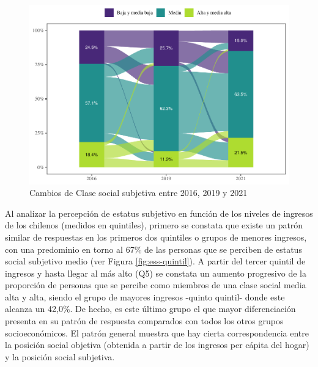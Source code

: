 \documentclass[
  12pt,
]{book}
\begin{document}
\begin{figure}

{\centering \includegraphics{reporte-elsoc_files/figure-latex/ess-cambio-1} 

}

\caption{Cambios de Clase social subjetiva entre 2016, 2019 y 2021}\label{fig:ess-cambio}
\end{figure}

Al analizar la percepción de estatus subjetivo en función de los niveles de ingresos de los chilenos (medidos en quintiles), primero se constata que existe un patrón similar de respuestas en los primeros dos quintiles o grupos de menores ingresos, con una predominio en torno al 67\% de las personas que se perciben de estatus social subjetivo medio (ver Figura \ref{fig:ess-quintil}). A partir del tercer quintil de ingresos y hasta llegar al más alto (Q5) se constata un aumento progresivo de la proporción de personas que se percibe como miembros de una clase social media alta y alta, siendo el grupo de mayores ingresos -quinto quintil- donde este alcanza un 42,0\%. De hecho, es este último grupo el que mayor diferenciación presenta en su patrón de respuesta comparados con todos los otros grupos socioeconómicos. El patrón general muestra que hay cierta correspondencia entre la posición social objetiva (obtenida a partir de los ingresos per cápita del hogar) y la posición social subjetiva.
\end{document}
